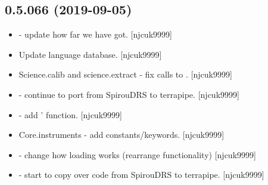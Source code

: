 \documentclass[a4paper,10pt,english]{report}
\begin{document}
\subsection{0.5.066 (2019-09-05)}
\label{\detokenize{misc/changelog:id76}}\begin{itemize}
\item {} 
 - update how far we have got. {[}njcuk9999{]}

\item {} 
Update language database. {[}njcuk9999{]}

\item {} 
Science.calib and science.extract - fix calls to .
{[}njcuk9999{]}

\item {} 
 - continue to port from SpirouDRS to
terrapipe. {[}njcuk9999{]}

\item {} 
 - add ’ function. {[}njcuk9999{]}

\item {} 
Core.instruments - add  constants/keywords. {[}njcuk9999{]}

\item {} 
 - change how loading works (rearrange
functionality) {[}njcuk9999{]}

\item {} 
 - start to copy over code from SpirouDRS to
terrapipe. {[}njcuk9999{]}

\end{itemize}
\end{document}
